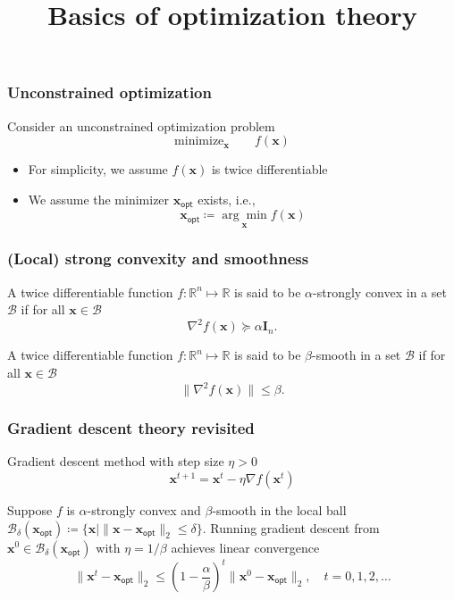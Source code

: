 \documentclass[compress,
mathserif,wide,%
]{beamer}
\title %
{Basics of optimization theory}
\begin{document}
\begin{frame}[plain]
  \titlepage

\end{frame}

\begin{frame}
	\frametitle{Unconstrained optimization}
	Consider an unconstrained optimization problem
\[
	\text{minimize}_{\bm{x}}\qquad f(\bm{x})
\]

\vfill

\begin{itemize}
\item For simplicity, we assume $f(\bm{x})$ is twice differentiable
\item We assume the minimizer $\bm{x}_{\mathsf{opt}}$ exists, i.e., 
\[
\bm{x}_{\mathsf{opt}} \coloneqq \underset{\bm{x}}{\arg\min} f(\bm{x})
\]
\end{itemize}
	
\end{frame}

\begin{frame}
	\frametitle{(Local) strong convexity and smoothness}
	\begin{definition}
		A twice differentiable function $f : \mathbb{R}^{n} \mapsto \mathbb{R}$ is said to be $\alpha$-strongly convex in a set $\mathcal{B}$ if for all $\bm{x} \in \mathcal{B}$
		\[
		\nabla^2 f(\bm{x}) \succeq \alpha \bm{I}_{n}.
		\]
	\end{definition}
	
	\vfill
	\begin{definition}
		A twice differentiable function $f : \mathbb{R}^{n} \mapsto \mathbb{R}$ is said to be $\beta$-smooth in a set $\mathcal{B}$ if for all $\bm{x} \in \mathcal{B}$
		\[
		\| \nabla^2 f(\bm{x}) \| \leq \beta.
		\]
	\end{definition}
\end{frame}


\begin{frame}
	\frametitle{Gradient descent theory revisited}
	Gradient descent method with step size $\eta > 0$
	\[
		\bm{x}^{t+1}=\bm{x}^t - \eta \nabla f(\bm{x}^t) 
	\]
	
	\begin{lemma}\label{lemma:GD}
		Suppose $f$ is $\alpha$-strongly convex and $\beta$-smooth in the local ball $\mathcal{B}_{\delta}(\bm{x}_{\mathsf{opt}}) \coloneqq \{\bm{x} \mid \|\bm{x} - \bm{x}_{\mathsf{opt}}\|_2 \leq \delta \}$. Running gradient descent from $\bm{x}^{0} \in \mathcal{B}_{\delta}(\bm{x}_{\mathsf{opt}})$ with $\eta = 1 / \beta$ achieves linear convergence
		\[
		\|\bm{x}^{t} -\bm{x}_{\mathsf{opt}}\|_2 \leq \left(1- {\frac{\alpha}{\beta}}  
\right)^{t}\|\bm{x}^{0} -\bm{x}_{\mathsf{opt}}\|_2, \quad t = 0, 1, 2, \ldots
		\]
	\end{lemma}	
	

\end{frame}
\end{document}
